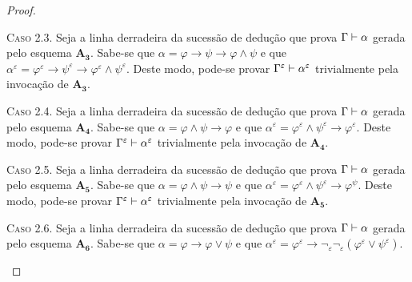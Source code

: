 \begin{theorem}
\begin{proof}
                \begin{subcase}
                    \textsc{Caso 2.3.}
                    Seja a linha derradeira da sucessão de dedução que prova $\Gamma\mathrel{\vdash}\alpha$ gerada pelo esquema $\hyperref[MA3]{\mathbf{A_3}}$.
                    Sabe-se que $\alpha=\varphi\to\psi\to\varphi\wedge\psi$ e que $\alpha^\varepsilon=\varphi^\varepsilon\to\psi^\varepsilon\to\varphi^\varepsilon\wedge\psi^\varepsilon$.
                    Deste modo, pode-se provar $\Gamma^\varepsilon\mathrel{\vdash}\alpha^\varepsilon$ trivialmente pela invocação de $\hyperref[IA3]{\mathbf{A_3}}$.
                \end{subcase}

                \begin{subcase}
                    \textsc{Caso 2.4.}
                    Seja a linha derradeira da sucessão de dedução que prova $\Gamma\mathrel{\vdash}\alpha$ gerada pelo esquema $\hyperref[MA4]{\mathbf{A_4}}$.
                    Sabe-se que $\alpha=\varphi\wedge\psi\to\varphi$ e que $\alpha^\varepsilon=\varphi^\varepsilon\wedge\psi^\varepsilon\to\varphi^\varepsilon$.
                    Deste modo, pode-se provar $\Gamma^\varepsilon\mathrel{\vdash}\alpha^\varepsilon$ trivialmente pela invocação de $\hyperref[IA4]{\mathbf{A_4}}$.
                \end{subcase}

                \begin{subcase}
                    \textsc{Caso 2.5.}
                    Seja a linha derradeira da sucessão de dedução que prova $\Gamma\mathrel{\vdash}\alpha$ gerada pelo esquema $\hyperref[MA5]{\mathbf{A_5}}$.
                    Sabe-se que $\alpha=\varphi\wedge\psi\to\psi$ e que $\alpha^\varepsilon=\varphi^\varepsilon\wedge\psi^\varepsilon\to\varphi^\psi$.
                    Deste modo, pode-se provar $\Gamma^\varepsilon\mathrel{\vdash}\alpha^\varepsilon$ trivialmente pela invocação de $\hyperref[IA5]{\mathbf{A_5}}$.
                \end{subcase}

                \begin{subcase}
                    \textsc{Caso 2.6.}
                    Seja a linha derradeira da sucessão de dedução que prova $\Gamma\mathrel{\vdash}\alpha$ gerada pelo esquema $\hyperref[MA6]{\mathbf{A_6}}$.
                    Sabe-se que $\alpha=\varphi\to\varphi\vee\psi$ e que $\alpha^\varepsilon=\varphi^\varepsilon\to\neg_\varepsilon\neg_\varepsilon(\varphi^\varepsilon\vee\psi^\varepsilon)$.
                \end{subcase}


\end{proof}
\end{theorem}
